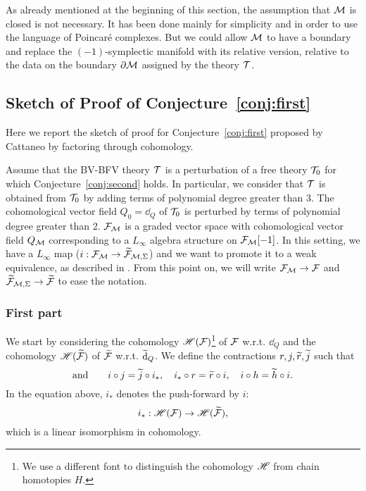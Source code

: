 As already mentioned at the beginning of this section, the assumption that $\mathcal{M}$ is closed is not necessary.
It has been done mainly for simplicity and in order to use the language of Poincaré complexes.
But we could allow $\mathcal{M}$ to have a boundary and replace the $(-1)$-symplectic manifold with its relative version, relative to the data on the boundary $\partial \mathcal{M}$ assigned by the theory $\mathcal{T}$.

\subsection{Sketch of Proof of Conjecture~\ref{conj:first}}
\label{subsec:sketch_proof}

Here we report the sketch of proof for Conjecture~\ref{conj:first} proposed by Cattaneo \etal by factoring through cohomology.

Assume that the BV-BFV theory $\mathcal{T}$ is a perturbation of a free theory $\mathcal{T}_0$ for which Conjecture~\ref{conj:second} holds.
In particular, we consider that $\mathcal{T}$ is obtained from $\mathcal{T}_0$ by adding terms of polynomial degree greater than 3.
The cohomological vector field $Q_0 = \dd_Q$ of $\mathcal{T}_0$ is perturbed by terms of polynomial degree greater than 2.
$\mathcal{F}_{\mathcal{M}}$ is a graded vector space with cohomological vector field $Q_{\mathcal{M}}$ corresponding to a $L_\infty$ algebra structure on $\mathcal{F}_{\mathcal{M}}[-1]$.
In this setting, we have a $L_\infty$ map ($i:\mathcal{F}_{\mathcal{M}} \rightarrow \widetilde{\mathcal{F}}_{\mathcal{M}, \Sigma}$) and we want to promote it to a weak equivalence, as described in .
From this point on, we will write $\mathcal{F}_{\mathcal{M}} \rightarrow \mathcal{F}$ and $\widetilde{\mathcal{F}}_{\mathcal{M}, \Sigma} \rightarrow \widetilde{\mathcal{F}}$ to ease the notation.

\subsubsection{First part}
\label{subsubsec:first_part}

We start by considering the cohomology $\mathscr{H}(\mathcal{F})$\footnote{We use a different font to distinguish the cohomology $\mathscr{H}$ from chain homotopies $H$.}
of $\mathcal{F}$ w.r.t. $\dd_Q$ and the cohomology $\mathscr{H}(\widetilde{\mathcal{F}})$ of $\widetilde{\mathcal{F}}$ w.r.t. $\widetilde{\dd}_Q$.
We define the contractions $r, j, \widetilde{r}, \widetilde{j}$ such that
\begin{equation}
    
\end{equation}
\begin{equation}
\label{eq:contractions}
    \text{and} \qquad
    i \circ j = \widetilde{j} \circ i_*, \quad
    i_* \circ r = \widetilde{r} \circ i, \quad
    i \circ h = \widetilde{h} \circ i .
\end{equation}
In the equation above, $i_*$ denotes the push-forward by $i$:
\begin{equation*}
    i_* : \mathscr{H}(\mathcal{F}) \rightarrow \mathscr{H}(\widetilde{\mathcal{F}}) ,
\end{equation*}
which is a linear isomorphism in cohomology.

